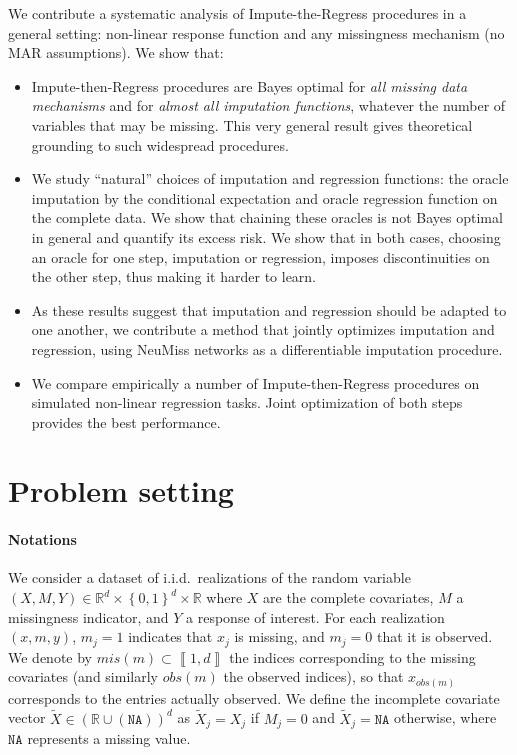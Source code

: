 \documentclass{article}
\newcommand{\RR}{\mathbb{R}}
\newcommand{\Dcal}{\mathcal{D}}
\newcommand{\NA}{\mathtt{NA}}
\newcommand{\br}[1]{\left(#1\right)}
\newcommand{\cbr}[1]{\left\{#1\right\}}
\newcommand{\bbr}[1]{\left\llbracket#1\right\rrbracket}
\theoremstyle{plain}
\begin{document}
We contribute a systematic analysis of Impute-the-Regress procedures in a general setting: non-linear response function and any missingness mechanism (no MAR assumptions).
We show that:
\begin{itemize}[leftmargin=1.5em, itemsep=.5ex, topsep=-.5ex, parsep=.5ex, partopsep=-.5ex]
    \item Impute-then-Regress procedures are Bayes optimal for \emph{all missing data mechanisms} and for \emph{almost all imputation functions}, whatever the number of variables that may be missing. This very general result gives theoretical grounding to such widespread procedures.
    
    \item We study ``natural'' choices of imputation and regression functions: the oracle imputation by the conditional expectation and oracle regression function on the complete data. We show that chaining these oracles is not Bayes optimal in general and quantify its excess risk. We show that in both cases, choosing an oracle for one step, imputation or regression, imposes discontinuities on the other step, thus making it harder to learn.
    
    \item As these results suggest that imputation and regression should be adapted to one another, we contribute a method that jointly optimizes imputation and regression, using NeuMiss networks \citep{LeMorvan2020NeuMiss} as a differentiable imputation procedure.
    
    \item We compare empirically a number of Impute-then-Regress procedures on simulated non-linear regression tasks. Joint optimization of both steps provides the best performance.

\end{itemize}

\section{Problem setting}
\paragraph{Notations} We consider a dataset of i.i.d.\ realizations of the random variable $(X, M, Y) \in \RR^d \times \cbr{0, 1}^d \times \RR$ where $X$ are the complete covariates, $M$ a missingness indicator, and $Y$ a response of interest. For each realization $(x, m, y)$, $m_j=1$ indicates that $x_j$ is missing, and $m_j=0$ that it is observed. We denote by $mis(m) \subset \bbr{1, d}$ the indices corresponding to the missing covariates (and similarly $obs(m)$ the observed indices), so that $x_{obs(m)}$ corresponds to the entries actually observed. We define the incomplete covariate vector $\widetilde{X} \in \br{\RR \cup \br{\NA}}^d$ as $\widetilde{X}_j = X_j$ if $M_j = 0$ and $\widetilde{X}_j = \NA$ otherwise, where $\NA$ represents a missing value.
\end{document}
